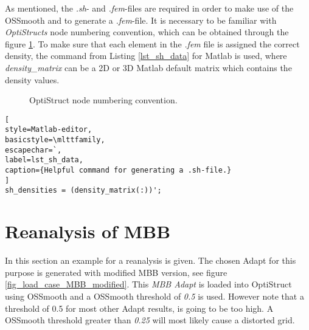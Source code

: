     As mentioned, the\emph{ .sh}- and\emph{ .fem}-files are required in
     order to make use of the OSSmooth and
  to generate a \emph{.fem}-file. It is necessary to be familiar with
  \emph{OptiStructs} node numbering convention,
  which can be obtained through the figure
   \ref{fig_optistruct_node_1}.
   To make sure that each element in the \emph{.fem} file is assigned the correct density, the command from Listing \ref{lst_sh_data} for Matlab
   is used, where \textit{density\_matrix} can be a 2D or 3D Matlab default matrix which contains the density values. 
 
 \begin{figure} [!h]
 \centering
 \def\svgwidth{0.70\textwidth}
 
 \caption{OptiStruct node numbering convention.}    %
 \label{fig_optistruct_node_1}          %
\end{figure} 
\begin{lstlisting}[
style=Matlab-editor,
basicstyle=\mlttfamily,
escapechar=`,
label=lst_sh_data,
caption={Helpful command for generating a .sh-file.}
]
sh_densities = (density_matrix(:))';
\end{lstlisting} 

\section{Reanalysis of MBB}
In this section an example for a reanalysis is given. The chosen Adapt for this purpose is generated with modified MBB version, see figure
\ref{fig_load_case_MBB_modified}.
This \textit{ MBB Adapt} is loaded into OptiStruct using OSSmooth and a 
OSSmooth threshold of \emph{0.5} is used.
 However note that a threshold of 0.5
 for most other Adapt results, is going to be too high. A OSSmooth 
 threshold greater than \emph{0.25} will most likely cause a distorted grid.\\

